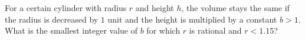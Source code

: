 For a certain cylinder with radius $r$ and height $h$, the volume stays the same if the radius is decreased by $1$ unit and the height is multiplied by a constant $b>1$. What is the smallest integer value of $b$ for which $r$ is rational and $r<1.15$?

